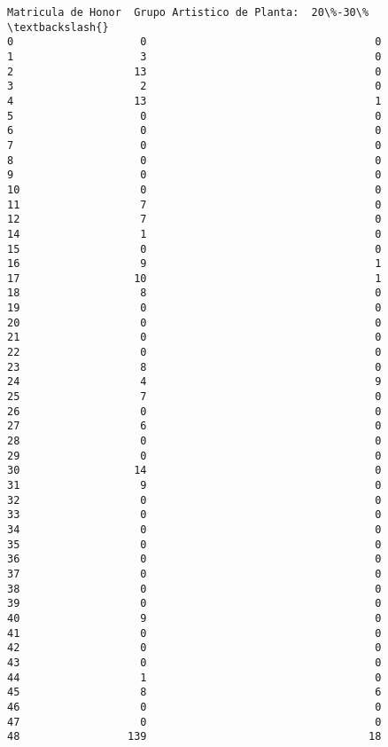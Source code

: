 \documentclass[11pt]{article}
\begin{document}
\begin{Verbatim}[commandchars=\\\{\}]
    Matricula de Honor  Grupo Artistico de Planta:  20\%-30\%  \textbackslash{}
0                    0                                    0   
1                    3                                    0   
2                   13                                    0   
3                    2                                    0   
4                   13                                    1   
5                    0                                    0   
6                    0                                    0   
7                    0                                    0   
8                    0                                    0   
9                    0                                    0   
10                   0                                    0   
11                   7                                    0   
12                   7                                    0   
14                   1                                    0   
15                   0                                    0   
16                   9                                    1   
17                  10                                    1   
18                   8                                    0   
19                   0                                    0   
20                   0                                    0   
21                   0                                    0   
22                   0                                    0   
23                   8                                    0   
24                   4                                    9   
25                   7                                    0   
26                   0                                    0   
27                   6                                    0   
28                   0                                    0   
29                   0                                    0   
30                  14                                    0   
31                   9                                    0   
32                   0                                    0   
33                   0                                    0   
34                   0                                    0   
35                   0                                    0   
36                   0                                    0   
37                   0                                    0   
38                   0                                    0   
39                   0                                    0   
40                   9                                    0   
41                   0                                    0   
42                   0                                    0   
43                   0                                    0   
44                   1                                    0   
45                   8                                    6   
46                   0                                    0   
47                   0                                    0   
48                 139                                   18   


\end{Verbatim}
\end{document}
